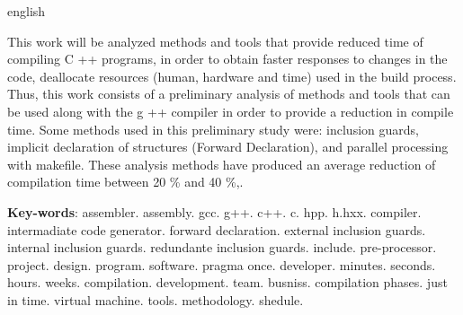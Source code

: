 \begin{resumo}[Abstract]
 \begin{otherlanguage*}{english}

   This work will be analyzed methods and tools
 that provide reduced time of compiling C ++ programs,
 in order to obtain faster responses to changes in the code,
 deallocate resources (human, hardware and time) used in the
 build process. Thus, this work consists of a preliminary
 analysis of methods and tools that can be used along with
 the g ++ compiler in order to provide a reduction in compile
 time. Some methods used in this preliminary study were:
 inclusion guards, implicit declaration of structures
 (Forward Declaration), and parallel processing with makefile.
  These analysis methods have produced an average reduction of
 compilation time between 20 \% and 40 \%,.
   \vspace{\onelineskip}
 
   \noindent 
   \textbf{Key-words}: assembler. assembly. gcc. g++. c++. c. hpp. h.hxx. compiler. intermadiate code generator. forward declaration. external inclusion guards. internal inclusion guards. redundante inclusion guards. include. pre-processor. project. design. program. software. pragma once. developer. minutes. seconds. hours. weeks. compilation. development. team. busniss. compilation phases. just in time. virtual machine. tools. methodology. shedule.
 \end{otherlanguage*}
\end{resumo}
